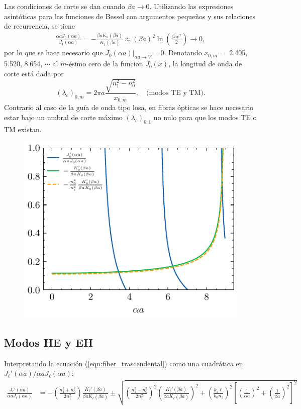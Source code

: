 Las condiciones de corte se dan cuando $\beta a \to 0$. Utilizando las expresiones asintóticas para las funciones de Bessel con argumentos pequeños y sus relaciones de recurrencia, se tiene
\begin{align*}
	\frac{\alpha a J_0(\alpha a)}{J_1(\alpha a)}  = -\frac{\beta a K_{0}(\beta a)} {K_1(\beta a)} \approx (\beta a)^2\ln\left(\frac{\beta a e^\gamma}{2}\right) \to 0,
\end{align*}
por lo que se hace necesario que $\left. J_0(\alpha a)\right|_{\alpha a \to V} = 0$. Denotando $x_{0,m}=$ 2.405,  5.520,  8.654, $\cdots$ al $m$-ésimo cero de la funcion $J_0(x)$, la longitud de onda de corte está dada por 
\begin{equation}
(\lambda_c)_{0,m} = 2\pi a \frac{\sqrt{n_1^2 - n_0^2}}{x_{0,m}}, \quad\text{(modos TE y TM).}
\end{equation} Contrario al caso de la guía de onda tipo losa, en fibras ópticas se hace necesario estar bajo un umbral de corte máximo $(\lambda_c)_{0,1}$ no nulo para que los modos TE o TM existan.

\begin{figure}[H]
	\centering
	\includegraphics[width=0.7\linewidth]{media/fibergraphical}
\end{figure}

\subsection{Modos HE y EH}
Interpretando la ecuación (\ref{eqn:fiber_trascendental}) como una cuadrática en $J_\ell'(\alpha a)/\alpha a J_\ell(\alpha a)$:
\begin{align*}
	\frac{J_\ell'(\alpha a)}{\alpha a J_\ell(\alpha a)} &= -\left(\frac{n_1^2+n_0^2}{2n_1^2}\right) \frac{K_\ell'(\beta a)}{\beta a K_\ell(\beta a)}\pm\sqrt{\left(\frac{n_1^2-n_0^2}{2n_1^2}\right)^2\left(\frac{K_\ell'(\beta a)}{\beta a K_\ell(\beta a)}\right)^2+ \left( \frac{ k_z \ell}{ k_0 n_1} \right)^2\left[ \left(\frac{1}{\alpha a}\right)^2 + \left(\frac{1}{\beta a}\right)^2 \right]^2 }
\end{align*}

